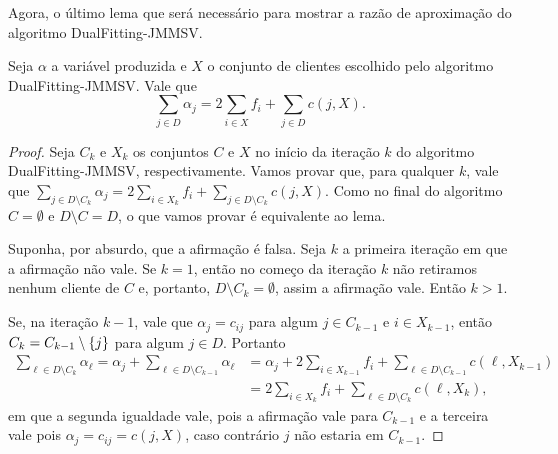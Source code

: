 Agora, o último lema que será necessário para mostrar a razão de aproximação do algoritmo {\sc DualFitting-JMMSV}.

\begin{lemma}
\label{greedy:5}
Seja $\alpha$ a variável produzida e $X$ o conjunto de clientes escolhido pelo algoritmo {\sc DualFitting-JMMSV}. Vale que 
\[ \sum_{j \in D} \alpha_j =  2\sum_{i \in X} f_i + \sum_{j \in D} c(j,X) .
\]
\end{lemma}

\begin{proof}
    Seja $C_k$ e $X_k$ os conjuntos $C$ e $X$ no início da iteração $k$ do algoritmo {\sc DualFitting-JMMSV}, respectivamente.
Vamos provar que, para qualquer $k$, vale que $\sum_{j \in D \setminus C_k} \alpha_j = 2 \sum_{i \in X_k} f_i + \sum_{j \in D \setminus C_k} c(j,X) $. Como no final do algoritmo $C = \emptyset$ e $D\setminus C = D$, o que vamos provar é equivalente ao lema.

Suponha, por absurdo, que a afirmação é falsa. Seja $k$ a primeira iteração em que a afirmação não vale. Se $k=1$, então no começo da iteração $k$ não retiramos nenhum cliente de $C$ e, portanto, $D\setminus C_k = \emptyset$, assim a afirmação vale. Então $k > 1$.

Se, na iteração $k-1$, vale que $\alpha_j = c_{ij}$ para algum $j \in C_{k-1}$ e $i \in X_{k-1}$, então $C_k = C_{k-1} \setminus \{j\}$ para algum $j \in D$. Portanto 
\begin{subequations}
\begin{align*}
 \sum_{\ell \in D \setminus C_k} \alpha_\ell =  \alpha_j + \sum_{\ell \in D \setminus C_{k-1}} \alpha_\ell  &=  \alpha_j + 2 \sum_{i \in X_{k-1}} f_i +\sum_{\ell \in D\setminus  C_{k-1}}c(\ell,X_{k-1}) \\
 &= 2 \sum_{i \in X_{k}} f_i + \sum_{\ell \in D\setminus C_{k}}c(\ell,X_k) ,
\end{align*}
\end{subequations}
em que a segunda igualdade vale, pois a afirmação vale para $C_{k-1}$ e a terceira vale pois $\alpha_j = c_{ij} = c(j,X)$, caso contrário $j$ não estaria em $C_{k-1}$.


\end{proof}
